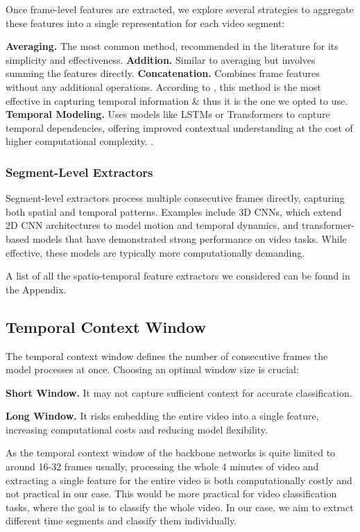 Once frame-level features are extracted, we explore several strategies to aggregate these features into a single representation for each video segment:

\noindent\textbf{\small{Averaging.}} The most common method, recommended in the literature \cite{dinov2} for its simplicity and effectiveness.
\noindent\textbf{\small{Addition.}} Similar to averaging but involves summing the features directly. 
\noindent\textbf{\small{Concatenation.}} Combines frame features without any additional operations. According to \cite{dinov2}, this method is the most effective in capturing temporal information \& thus it is the one we opted to use.
\noindent\textbf{\small{Temporal Modeling.}} Uses models like LSTMs or Transformers to capture temporal dependencies, offering improved contextual understanding at the cost of higher computational complexity. \cite{action-clip}.

\subsubsection{Segment-Level Extractors}
Segment-level extractors process multiple consecutive frames directly, capturing both spatial and temporal patterns. Examples include 3D CNNs, which extend 2D CNN architectures to model motion and temporal dynamics, and transformer-based models that have demonstrated strong performance on video tasks. While effective, these models are typically more computationally demanding.

A list of all the spatio-temporal feature extractors we considered can be found in the Appendix.

\subsection{Temporal Context Window}
The temporal context window defines the number of consecutive frames the model processes at once. Choosing an optimal window size is crucial:

\noindent\textbf{\small{Short Window.}}
It may not capture sufficient context for accurate classification.

\noindent\textbf{\small{Long Window.}}
It risks embedding the entire video into a single feature, increasing computational costs and reducing model flexibility.

As the temporal context window of the backbone networks is quite limited to around 16-32 frames usually, processing the whole 4 minutes of video and extracting a single feature for the entire video is both computationally costly and not practical in our case. This would be more practical for video classification tasks, where the goal is to classify the whole video. In our case, we aim to extract different time segments and classify them individually.

